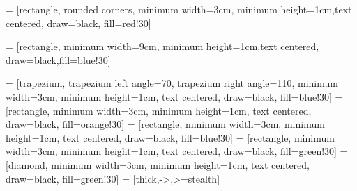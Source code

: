 \usepackage[a4paper, top=25.4mm, bottom=20.5mm, right=20.5mm, left=40mm]{geometry} 

\usepackage{subfiles}           %

\usepackage[final]{graphicx}    %

\usepackage[numbers,sort]{natbib}
\usepackage{parskip}
\usepackage{subcaption}
\usepackage{setspace}
\usepackage{longtable}
\usepackage{multirow}
\usepackage{mathtools}
\usepackage{soul}
\usepackage{tikz}
\usetikzlibrary{arrows}
\usetikzlibrary{decorations.markings}
\usetikzlibrary{calc}
\usetikzlibrary{shapes, positioning}
\usetikzlibrary{shapes.geometric}
\usetikzlibrary{patterns,snakes}
\usetikzlibrary{decorations.text}
\usetikzlibrary{arrows.meta}
\usepackage{tikz}
\usetikzlibrary{mindmap}
\usetikzlibrary{shapes.geometric,arrows}
 = [rectangle, rounded corners, minimum width=3cm, minimum height=1cm,text centered, draw=black, fill=red!30]

 = [rectangle, minimum width=9cm, minimum height=1cm,text centered, draw=black,fill=blue!30]

 = [trapezium, trapezium left angle=70, trapezium right angle=110, minimum width=3cm, minimum height=1cm, text centered, draw=black, fill=blue!30]
 = [rectangle, minimum width=3cm, minimum height=1cm, text centered, draw=black, fill=orange!30]
 = [rectangle, minimum width=3cm, minimum height=1cm, text centered, draw=black, fill=blue!30]
 = [rectangle, minimum width=3cm, minimum height=1cm, text centered, draw=black, fill=green!30]
 = [diamond, minimum width=3cm, minimum height=1cm, text centered, draw=black, fill=green!30]
 = [thick,->,>=stealth]
\usepackage{pdflscape}
\usepackage{standalone}
\usepackage{float}
\usepackage{caption}
\usepackage{subcaption}
\usepackage{amsmath}
\usepackage{amsfonts}
\usepackage{amsthm}
\usepackage[ruled]{algorithm2e}
\usepackage{rotating,tabularx}
\usepackage{adjustbox}
\usepackage{enumerate}
\usepackage{hyperref}
\usepackage[utf8]{inputenc}
\usepackage[toc]{appendix}
\usepackage{minted}
\usepackage{array}
\usepackage{booktabs}
\usepackage{siunitx}
\usepackage{multicol}
\usepackage{multirow}
\usepackage[toc]{appendix}
\usepackage{colortbl}

